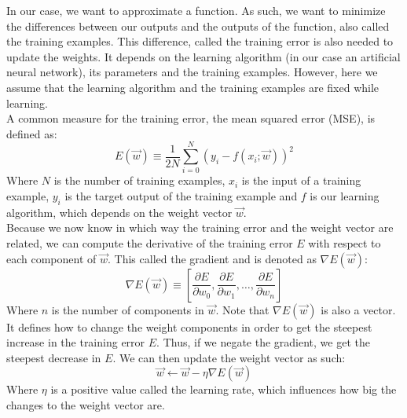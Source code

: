 In our case, we want to approximate a function. As such, we want to minimize the differences between our outputs and the outputs of the function, also called the training examples.
This difference, called the training error is also needed to update the weights. It depends on the learning algorithm (in our case an artificial neural network), its parameters and the training examples.
However, here we assume that the learning algorithm and the training examples are fixed while learning.\\
A common measure for the training error, the mean squared error (MSE), is defined as:
\begin{equation}
    E(\overrightarrow{w}) \equiv \frac{1}{2N} \sum_{i=0}^N (y_i - f(x_i;\overrightarrow{w}))^2
\end{equation}
Where $N$ is the number of training examples, $x_i$ is the input of a training example, $y_i$ is the target output of the training example and $f$ is our learning algorithm, which depends on the weight vector $\overrightarrow{w}$.\\

Because we now know in which way the training error and the weight vector are related, we can compute the derivative of the training error $E$ with respect to each component of $\overrightarrow{w}$. This called the gradient and is denoted as $\nabla E(\overrightarrow{w})$:
\begin{equation}
    \nabla E(\overrightarrow{w}) \equiv \left [ \frac{\partial E}{\partial w_0}, \frac{\partial E}{\partial w_1}, \dots, \frac{\partial E}{\partial w_n} \right ]
\end{equation}
Where $n$ is the number of components in $\overrightarrow{w}$. Note that $\nabla E(\overrightarrow{w})$ is also a vector. It defines how to change the weight components in order to get the steepest increase in the training error $E$. Thus, if we negate the gradient, we get the steepest decrease in $E$. We can then update the weight vector as such:
\begin{equation}
    \overrightarrow{w} \gets \overrightarrow{w} - \eta \nabla E(\overrightarrow{w})
\end{equation}
Where $\eta$ is a positive value called the learning rate, which influences how big the changes to the weight vector are.\\

